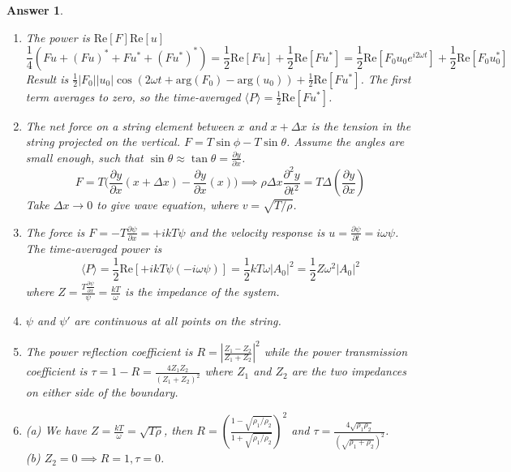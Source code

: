 \documentclass[a4paper]{article}
\newtheorem{ans}{Answer}[subsection]
\theoremstyle{new}
\begin{document}
\begin{ans}\leavevmode
\begin{enumerate}[label=(\roman*)]
\item The power is $\text{Re}[F]\text{Re}[u]$
$$\frac{1}{4}(Fu+(Fu)^*+Fu^*+(Fu^*)^*)=\frac{1}{2}\text{Re}[Fu]+\frac{1}{2}\text{Re}[Fu^*]=\frac{1}{2}\text{Re}[F_0u_0e^{i2\omega t}]+\frac{1}{2}\text{Re}[F_0u_0^*]$$
Result is $\frac{1}{2}|F_0||u_0|\cos(2\omega t+\text{arg}(F_0)-\text{arg}(u_0))+\frac{1}{2}\text{Re}[Fu^*]$. The first term averages to zero, so the time-averaged $\langle P\rangle=\frac{1}{2}\text{Re}[Fu^*]$.
\item The net force on a string element between $x$ and $x+\Delta x$ is the tension in the string projected on the vertical. $F=T\sin\phi-T\sin\theta$. Assume the angles are small enough, such that $\sin\theta\approx\tan\theta=\frac{\partial y}{\partial x}$.
$$F=T\bigg(\frac{\partial y}{\partial x}(x+\Delta x)-\frac{\partial y}{\partial x}(x)\bigg)\implies\rho\Delta x\frac{\partial^2y}{\partial t^2}=T\Delta(\frac{\partial y}{\partial x})$$
Take $\Delta x\rightarrow0$ to give wave equation, where $v=\sqrt{T/\rho}$.
\item The force is $F=-T\frac{\partial\psi}{\partial x}=+ikT\psi$ and the velocity response is $u=\frac{\partial\psi}{\partial t}=i\omega\psi$. The time-averaged power is
$$\langle P\rangle=\frac{1}{2}\text{Re}[+ikT\psi(-i\omega\psi)]=\frac{1}{2}kT\omega|A_0|^2=\frac{1}{2}Z\omega^2|A_0|^2$$
where $Z=\frac{T\frac{\partial\psi}{\partial x}}{\psi}=\frac{kT}{\omega}$ is the impedance of the system.
\item $\psi$ and $\psi'$ are continuous at all points on the string.
\item The power reflection coefficient is $R=|\frac{Z_1-Z_2}{Z_1+Z_2}|^2$ while the power transmission coefficient is $\tau=1-R=\frac{4Z_1Z_2}{(Z_1+Z_2)^2}$ where $Z_1$ and $Z_2$ are the two impedances on either side of the boundary.
\item (a) We have $Z=\frac{kT}{\omega}=\sqrt{T\rho}$, then $R=(\frac{1-\sqrt{\rho_1/\rho_2}}{1+\sqrt{\rho_1/\rho_2}})^2$ and $\tau=\frac{4\sqrt{\rho_1\rho_2}}{(\sqrt{\rho_1+\rho_2})^2}$.\\[5pt]
(b) $Z_2=0\implies R=1,\tau=0$.
\end{enumerate}
\end{ans}
\newpage
\end{document}
